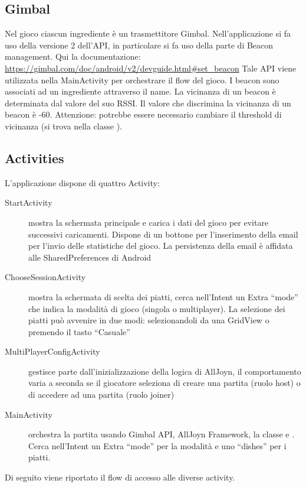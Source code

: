 \subsection{Gimbal}
Nel gioco ciascun ingrediente è un trasmettitore Gimbal. Nell’applicazione si fa uso della versione 2 dell’API, in particolare si fa uso della parte di Beacon management. Qui la documentazione: \url{https://gimbal.com/doc/android/v2/devguide.html\#set\_beacon}
Tale API viene utilizzata nella MainActivity per orchestrare il flow del gioco. I beacon sono associati ad un ingrediente attraverso il name. La vicinanza di un beacon è determinata dal valore del suo RSSI. Il valore che discrimina la vicinanza di un beacon è -60. Attenzione: potrebbe essere necessario cambiare il threshold di vicinanza (si trova nella classe ).


\subsection{Activities}

L’applicazione dispone di quattro Activity:
\begin{description}
\item[StartActivity] mostra la schermata principale e carica i dati del gioco per evitare successivi caricamenti. Dispone di un bottone per l’inserimento della email per l’invio delle statistiche del gioco. La persistenza della email è affidata alle SharedPreferences di Android

\item[ChooseSessionActivity] mostra la schermata di scelta dei piatti, cerca nell’Intent un Extra “mode” che indica la modalità di gioco (singola o multiplayer). La selezione dei piatti può avvenire in due modi: selezionandoli da una GridView o premendo il tasto “Casuale”

\item[MultiPlayerConfigActivity] gestisce parte dall’inizializzazione della logica di AllJoyn, il comportamento varia a seconda se il giocatore seleziona di creare una partita (ruolo host) o di accedere ad una partita (ruolo joiner)

\item[MainActivity] orchestra la partita usando Gimbal API, AllJoyn Framework, la classe  e . Cerca nell’Intent un Extra “mode” per la modalità e uno “dishes” per i piatti. 
\end{description}

Di seguito viene riportato il flow di accesso alle diverse activity.

